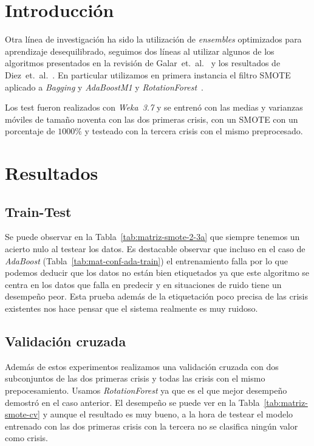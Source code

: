 \documentclass[a4paper,12pt,twoside,oldfontcommands]{memoir}
\begin{document}
	\section{Introducción}
	Otra línea de investigación ha sido la utilización de \textit{ensembles} optimizados para aprendizaje desequilibrado, seguimos dos líneas al utilizar algunos de los algoritmos presentados en la revisión de Galar~et.~al.~\cite{galar2012review} y los resultados de Diez~et.~al.~\cite{diez2015diversity}. En particular utilizamos en primera instancia el filtro SMOTE~\cite{wiki:smote} aplicado a \textit{Bagging} y \textit{AdaBoostM1} y \textit{RotationForest}~\cite{rodriguez2006rotation}.
	
	Los test fueron realizados con \textit{Weka}~\textit{3.7} y se entrenó con las medias y varianzas móviles de tamaño noventa con las dos primeras crisis, con un SMOTE con un porcentaje de $1000\%$ y testeado con la tercera crisis con el mismo preprocesado.
	
	\section{Resultados}
	\subsection{Train-Test}
	Se puede observar en la Tabla~\ref{tab:matriz-smote-2-3a} que siempre tenemos un acierto nulo al testear los datos. Es destacable observar que incluso en el caso de \textit{AdaBoost} (Tabla~\ref{tab:mat-conf-ada-train}) el entrenamiento falla por lo que podemos deducir que los datos no están bien etiquetados ya que este algoritmo se centra en los datos que falla en predecir y en situaciones de ruido tiene un desempeño peor. Esta prueba además de la etiquetación poco precisa de las crisis existentes nos hace pensar que el sistema realmente es muy ruidoso.
	
	\subsection{Validación cruzada}
	Además de estos experimentos realizamos una validación cruzada con dos subconjuntos de las dos primeras crisis y todas las crisis con el mismo prepocesamiento. Usamos \textit{RotationForest} ya que es el que mejor desempeño demostró en el caso anterior. El desempeño se puede ver en la Tabla~\ref{tab:matriz-smote-cv} y aunque el resultado es muy bueno, a la hora de testear el modelo entrenado con las dos primeras crisis con la tercera no se clasifica ningún valor como crisis.
	
\end{document}
